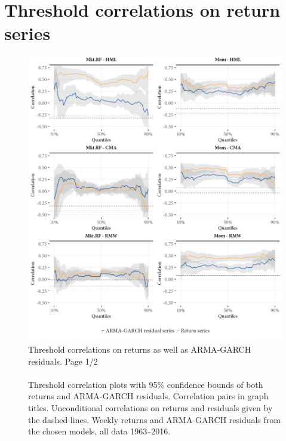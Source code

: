 \appendix
\appendixpageoff
\section{Threshold correlations on return series}
\label{app:threshold_return}
\begin{figure}[H]
  \centering
  \footnotesize
  \caption{Threshold correlations on returns as well as ARMA-GARCH residuals. Page 1/2 \\ \quad \\
  Threshold correlation plots with 95\% confidence bounds of both returns and ARMA-GARCH residuals. Correlation pairs in graph titles. Unconditional correlations on returns and residuals given by the dashed lines. Weekly returns and ARMA-GARCH residuals from the chosen models, all data 1963--2016.}
  \label{fig:appendix_threshold1}
  \includegraphics[scale=1]{graphics/appendix_threshold_1.png}  
\end{figure}
